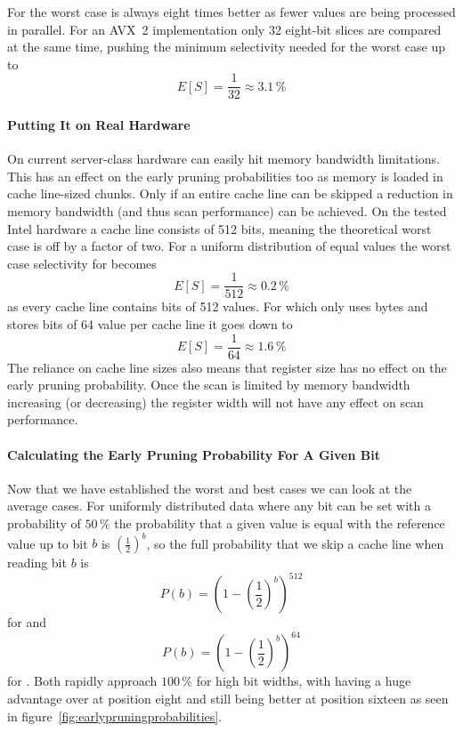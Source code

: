 For \bs{} the worst case is always eight times better as fewer values are being
processed in parallel. For an AVX~2 implementation only 32 eight-bit slices are
compared at the same time, pushing the minimum selectivity needed for the worst
case up to $$E[S]=\frac{1}{32}\approx 3.1\,\%$$

\paragraph{Putting It on Real Hardware}

On current server-class hardware \bwv{} can easily hit memory bandwidth
limitations. This has an effect on the early pruning probabilities too as
memory is loaded in cache line-sized chunks. Only if an entire cache line can
be skipped a reduction in memory bandwidth (and thus scan performance) can be
achieved. On the tested Intel hardware a cache line consists of 512 bits,
meaning the theoretical worst case is off by a factor of two. For a uniform
distribution of equal values the worst case selectivity for \bwv{} becomes
$$E[S]=\frac{1}{512}\approx 0.2\,\%$$ as every cache line contains bits of 512
values. For \bs{} which only uses bytes and stores bits of 64 value per cache
line  it goes down to $$E[S]=\frac{1}{64}\approx 1.6\,\%$$ The reliance on cache
line sizes also means that register size has no effect on the early pruning
probability. Once the scan is limited by memory bandwidth increasing (or
decreasing) the register width will not have any effect on scan performance.

\paragraph{Calculating the Early Pruning Probability For A Given Bit}

Now that we have established the worst and best cases we can look at the
average cases. For uniformly distributed data where any bit can be set with a
probability of $50\,\%$ the probability that a given value is equal with the
reference value up to bit $b$ is ${\left(\frac{1}{2}\right)}^b$,
so the full probability that we skip a cache line when reading bit $b$ is
$$P(b)={\left(1-{\left(\frac{1}{2}\right)}^b\right)}^{512}$$
for \bwv{} and
$$P(b)={\left(1-{\left(\frac{1}{2}\right)}^b\right)}^{64}$$
for \bs{}. Both rapidly approach $100\,\%$ for high bit widths, with \bs{}
having a huge advantage over \bwv{} at position eight and still being better at
position sixteen as seen in figure~\ref{fig:earlypruningprobabilities}.

